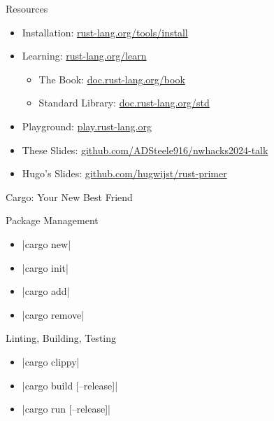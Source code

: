 \documentclass[8pt, aspectratio=169]{beamer}
\begin{document}
\begin{frame}{Resources}
\begin{itemize}
\item Installation: \alert{\href{https://rust-lang.org/tools/install}{rust-lang.org/tools/install}}
\item Learning: \alert{\href{https://rust-lang.org/learn}{rust-lang.org/learn}}
\begin{itemize}
\item The Book: \alert{\href{https://doc.rust-lang.org/book}{doc.rust-lang.org/book}}
\item Standard Library: \alert{\href{https://doc.rust-lang.org/std}{doc.rust-lang.org/std}}
\end{itemize}
\item Playground: \alert{\href{https://play.rust-lang.org}{play.rust-lang.org}}
\item These Slides: \alert{\href{https://github.com/ADSteele916/nwhacks2024-talk}{github.com/ADSteele916/nwhacks2024-talk}}
\item Hugo's Slides: \alert{\href{https://github.com/hugwijst/rust-primer}{github.com/hugwijst/rust-primer}}
\end{itemize}
\end{frame}

\begin{frame}{Cargo: Your New Best Friend}
\begin{block}{Package Management}
\begin{multicols}{4}
\begin{itemize}
\item \rustinline|cargo new|
\end{itemize}
\columnbreak
\begin{itemize}
\item \rustinline|cargo init|
\end{itemize}
\columnbreak
\begin{itemize}
\item \rustinline|cargo add|
\end{itemize}
\columnbreak
\begin{itemize}
\item \rustinline|cargo remove|
\end{itemize}
\end{multicols}
\end{block}

\begin{block}{Linting, Building, Testing}
\begin{multicols}{3}
\begin{itemize}
\item \rustinline|cargo clippy|
\end{itemize}
\columnbreak
\begin{itemize}
\item \rustinline|cargo build [--release]|
\end{itemize}
\columnbreak
\begin{itemize}
\item \rustinline|cargo run [--release]|
\end{itemize}
\end{multicols}
\end{block}
\end{frame}
\end{document}
